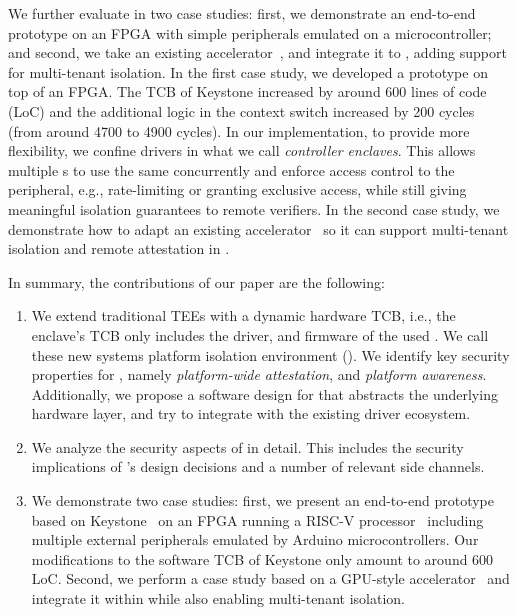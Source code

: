 We further evaluate \name in two case studies: first, we demonstrate an end-to-end prototype on an FPGA with simple peripherals emulated on a microcontroller; and second, we take an existing accelerator~\cite{zaruba2020manticore}, and integrate it to \name{}, adding support for multi-tenant isolation. In the first case study, we developed a prototype on top of an FPGA. The TCB of Keystone increased by around $600$ lines of code (LoC) and the additional logic in the context switch increased by 200 cycles (from around 4700 to 4900 cycles).
In our implementation, to provide more flexibility, we confine drivers in what we call \emph{controller enclaves}. This allows multiple \nameenclave{}s to use the same \sphw concurrently and enforce access control to the peripheral, e.g., rate-limiting or granting exclusive access, while still giving meaningful isolation guarantees to remote verifiers. In the second case study, we demonstrate how to adapt an existing accelerator~\cite{zaruba2020manticore} so it can support multi-tenant isolation and remote attestation in \name{}.



In summary, the contributions of our paper are the following:

\begin{enumerate}
  \item We extend traditional TEEs with a dynamic hardware TCB, i.e., the enclave's TCB only includes the driver, and firmware of the used \sphw. We call these new systems platform isolation environment (\name{}). We identify key security properties for \name{}, namely \emph{platform-wide attestation}, and \emph{platform awareness}. Additionally, we propose a software design for \name that abstracts the underlying hardware layer, and try to integrate with the existing driver ecosystem. 
  
  \item We analyze the security aspects of \name in detail. This includes the security implications of \name{}'s design decisions and a number of relevant side channels.
  
  \item We demonstrate two case studies: first, we present an end-to-end prototype based on Keystone~\cite{keystone} on an FPGA running a RISC-V processor~\cite{ariane} including multiple external peripherals emulated by Arduino microcontrollers. Our modifications to the software TCB of Keystone only amount to around 600 LoC. Second, we perform a case study based on a GPU-style accelerator~\cite{zaruba2020manticore} and integrate it within \name{} while also enabling multi-tenant isolation.

\end{enumerate}

